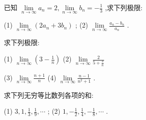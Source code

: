 \documentclass[lang=cn,newtx,10pt,scheme=chinese]{elegantbook}
\begin{document}
\begin{problemset}[练习]
\item 已知 \(\mathop{\lim }\limits_{{n \rightarrow \infty }}{a}_{n} = 2,\mathop{\lim }\limits_{{n \rightarrow \infty }}{b}_{n} = - \frac{1}{3}\) ,求下列极限:

(1) \(\mathop{\lim }\limits_{{n \rightarrow \infty }}\left( {2{a}_{n} + 3{b}_{n}}\right)\) ; (2) \(\mathop{\lim }\limits_{{n \rightarrow \infty }}\frac{{a}_{n} - {b}_{n}}{{a}_{n}}\) .

\item 求下列极限:

(1) \(\mathop{\lim }\limits_{{n \rightarrow \infty }}\left( {3 - \frac{1}{n}}\right)\) (2) \(\mathop{\lim }\limits_{{n \rightarrow \infty }}\frac{2}{5 + \frac{3}{n}}\)

(3) \(\mathop{\lim }\limits_{{n \rightarrow \infty }}\frac{n + 1}{n}\) (4) \(\mathop{\lim }\limits_{{n \rightarrow \infty }}\frac{n - 1}{{n}^{2} + 1}\) .

\item 求下列无穷等比数列各项的和:

(1) \(3,1,\frac{1}{3},\frac{1}{9},\cdots\) ; (2) \(1, - \frac{1}{2},\frac{1}{4}, - \frac{1}{8},\cdots\) .

\end{problemset}
\end{document}
